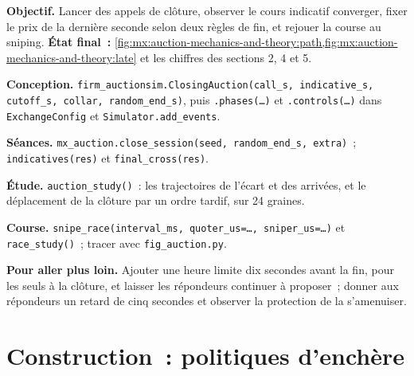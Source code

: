 \begin{tutorial}
\textbf{Objectif.} Lancer des appels de clôture, observer le cours indicatif converger, fixer le prix de la dernière seconde selon deux règles de fin, et rejouer la course au sniping.
\textbf{État final~:} \cref{fig:mx:auction-mechanics-and-theory:path,fig:mx:auction-mechanics-and-theory:late} et les chiffres des sections 2, 4 et 5.
\begin{tutsteps}
\item \textbf{Conception.} \texttt{firm\_auctionsim.ClosingAuction(call\_s, indicative\_s, cutoff\_s, collar, random\_end\_s)}, puis
\texttt{.phases(\dots)} et \texttt{.controls(\dots)} dans \texttt{ExchangeConfig} et \texttt{Simulator.add\_events}.
\item \textbf{Séances.} \texttt{mx\_auction.close\_session(seed, random\_end\_s, extra)}~; \texttt{indicatives(res)} et \texttt{final\_cross(res)}.
\item \textbf{Étude.} \texttt{auction\_study()}~: les trajectoires de l'écart et des arrivées, et le déplacement de la clôture par un ordre tardif, sur 24 graines.
\item \textbf{Course.} \texttt{snipe\_race(interval\_ms, quoter\_us=\dots, sniper\_us=\dots)} et \texttt{race\_study()}~; tracer avec \texttt{fig\_auction.py}.
\end{tutsteps}
\textbf{Pour aller plus loin.} Ajouter une heure limite dix secondes avant la fin, pour les seuls  à la clôture, et laisser les répondeurs continuer à proposer~; donner aux répondeurs
un retard de cinq secondes et observer la protection de la  s'amenuiser.
\end{tutorial}

\section{Construction~: politiques d'enchère}\label{bld:mx:auction-mechanics-and-theory:auctionsim}

